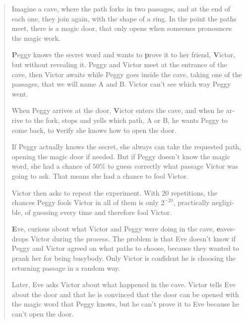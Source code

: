 \begin{otherlanguage}{english}
\hfil

\begin{quote}
	Imagine a cave, where the path forks in two passages, and at the end of each one, they join again, with the shape of a ring. In the point the paths meet, there is a magic door, that only opens when someones pronounces the magic work.
	
	\textbf{P}eggy knows the secret word and wants to \textbf{p}rove it to her friend, \textbf{V}ictor, but without revealing it.
	Peggy and Victor meet at the entrance of the cave, then Victor awaits while Peggy goes inside the cave, taking one of the passages, that we will name A and B. Victor can't see which way Peggy went. 
	
	When Peggy arrives at the door, \textbf{V}ictor enters the cave, and when he arrive to the fork, stops and yells which path, A or B, he wants Peggy to come back, to \textbf{v}erify she knows how to open the door.
		
	If Peggy actually knows the secret, she always can take the requested path, opening the magic door if needed.
	But if Peggy doesn't know the magic word, she had a chance of $50\%$ to guess correctly what passage Victor was going to ask. That means she had a chance to fool Victor.
	
	Victor then asks to repeat the experiment. With $20$ repetitions, the chances Peggy fools Victor in all of them is only  $2^{-20}$, practically negligible, of guessing every time and therefore fool Victor.
	
	\textbf{E}ve, curious about what Victor and Peggy were doing in the cave, \textbf{e}avesdrops Victor during the process. The problem is that Eve doesn't know if Peggy and Victor agreed on what paths to choose, because they wanted to prank her for being busybody. Only Victor is confident he is choosing the returning passage in a random way.
	
	Later, Eve asks Victor about what happened in the cave. Victor tells Eve about the door and that he is convinced that the door can be opened with the magic word that Peggy knows, but he can't prove it to Eve because he can't open the door. 
\end{quote}



\end{otherlanguage}
